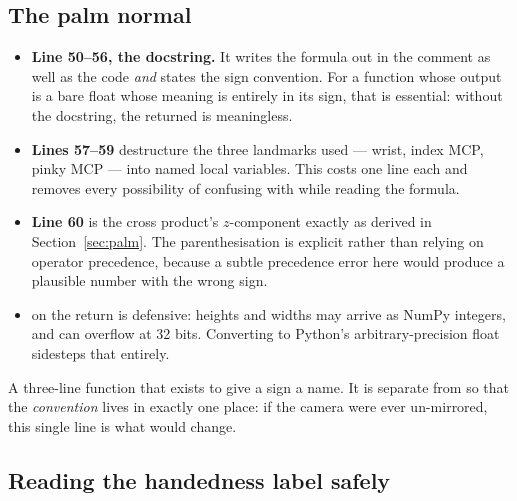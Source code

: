 \subsection{The palm normal}

\begin{codecard}

\end{codecard}

\begin{itemize}
  \item \textbf{Line 50--56, the docstring.} It writes the formula out in the comment as well as the
        code \emph{and} states the sign convention. For a function whose output is a bare float whose
        meaning is entirely in its sign, that is essential: without the docstring, the returned
         is meaningless.
  \item \textbf{Lines 57--59} destructure the three landmarks used --- wrist, index MCP, pinky MCP
        --- into named local variables. This costs one line each and removes every possibility of
        confusing  with  while reading the formula.
  \item \textbf{Line 60} is the cross product's $z$-component exactly as derived in
        Section~\ref{sec:palm}. The parenthesisation is explicit rather than relying on operator
        precedence, because a subtle precedence error here would produce a plausible number with the
        wrong sign.
  \item {} on the return is defensive: heights and widths may arrive as NumPy
        integers, and  can overflow at 32 bits. Converting to Python's
        arbitrary-precision float sidesteps that entirely.
\end{itemize}

\begin{codecard}

\end{codecard}

A three-line function that exists to give a sign a name. It is separate from 
so that the \emph{convention} lives in exactly one place: if the camera were ever un-mirrored, this
single line is what would change.

\subsection{Reading the handedness label safely}

